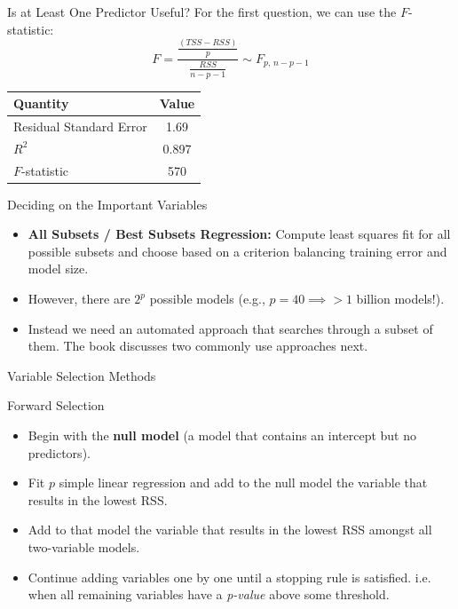 \documentclass[aspectratio=169, 11pt]{beamer}
\begin{document}
\begin{frame}{Is at Least One Predictor Useful?}
  For the first question, we can use the $F$-statistic:
  \[ F = \frac{\frac{(TSS - RSS)}{p}}{\frac{RSS}{n - p - 1}} \sim F_{p, \, n-p-1} \]

  \begin{table}
    \centering
    \begin{tabular}{l c}
      \toprule
      \textbf{Quantity} & \textbf{Value} \\
      \midrule
      Residual Standard Error & 1.69 \\
      $R^2$                   & 0.897 \\
      $F$-statistic           & 570 \\
      \bottomrule
    \end{tabular}
  \end{table}
\end{frame}

\begin{frame}{Deciding on the Important Variables}
  \begin{itemize}
    \item \textbf{All Subsets / Best Subsets Regression:} Compute least squares fit for all possible subsets and choose based on a criterion balancing training error and model size. \pause
    \item However, there are $2^p$ possible models (e.g., $p=40 \implies >1$ billion models!).
    \item Instead we need an automated approach that searches through a subset of them.  The book discusses two commonly use approaches next.
  \end{itemize}
\end{frame}

\begin{frame}{Variable Selection Methods}
  \begin{block}{Forward Selection}
    \begin{itemize}
      \item Begin with the \textbf{null model} (a model that contains an intercept but no predictors).
      \item Fit $p$ simple linear regression and add to the null model the variable that results in the lowest RSS.
      \item Add to that model the variable that results in the lowest RSS amongst all two-variable models.
      \item Continue adding variables one by one until a stopping rule is satisfied. i.e. when all remaining variables have a \textit{p-value} above some threshold.
    \end{itemize}
  \end{block}
\end{frame}
\end{document}

